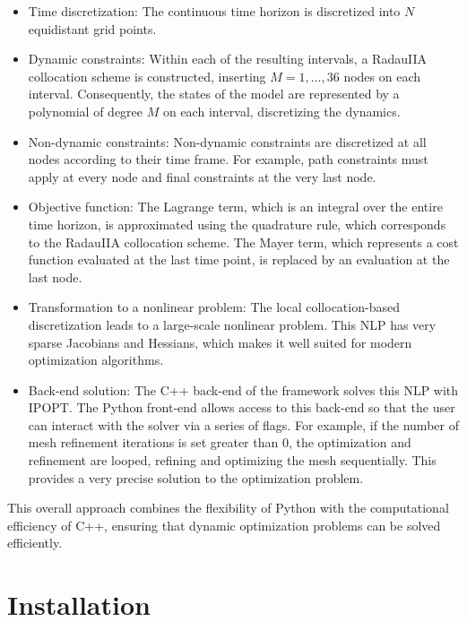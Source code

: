 \documentclass[12pt]{article}
\begin{document}
\begin{itemize}
	
	\item Time discretization:
	The continuous time horizon is discretized into $N$ equidistant grid points.
	
	\item {Dynamic constraints}:
	Within each of the resulting intervals, a RadauIIA collocation scheme is constructed, inserting $M = 1, \ldots, 36$ nodes on each interval. Consequently, the states of the model are represented by a polynomial of degree $M$ on each interval, discretizing the dynamics.
	
	\item {Non-dynamic constraints}:
	Non-dynamic constraints are discretized at all nodes according to their time frame. For example, path constraints must apply at every node and final constraints at the very last node.
	
	\item {Objective function}:
	The Lagrange term, which is an integral over the entire time horizon, is approximated using the quadrature rule, which corresponds to the RadauIIA collocation scheme.
	The Mayer term, which represents a cost function evaluated at the last time point, is replaced by an evaluation at the last node.
	
	\item {Transformation to a nonlinear problem}:
	The local collocation-based discretization leads to a large-scale nonlinear problem. This NLP has very sparse Jacobians and Hessians, which makes it well suited for modern optimization algorithms.
	
	\item {Back-end solution}:
	The C++ back-end of the framework solves this NLP with IPOPT. The Python front-end allows access to this back-end so that the user can interact with the solver via a series of flags. For example, if the number of mesh refinement iterations is set greater than 0, the optimization and refinement are looped, refining and optimizing the mesh sequentially. This provides a very precise solution to the optimization problem.
	
\end{itemize}
This overall approach combines the flexibility of Python with the computational efficiency of C++, ensuring that dynamic optimization problems can be solved efficiently.


\section{Installation}
\end{document}
